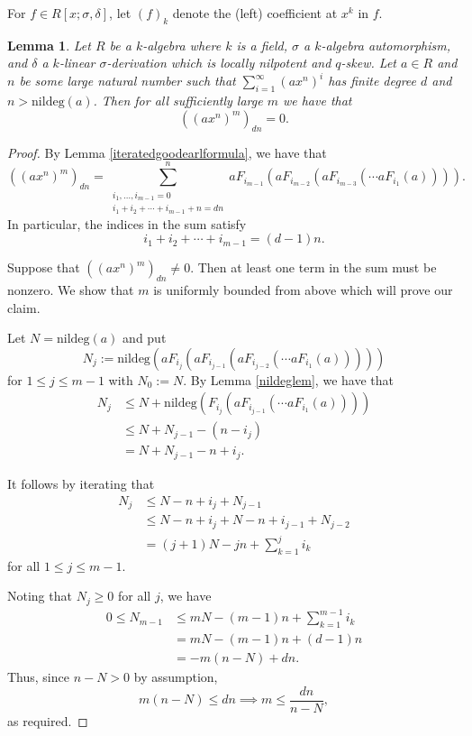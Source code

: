 \documentclass[12pt]{amsart}
\newtheorem{lem}[thm]{Lemma}
\theoremstyle{definition}
\theoremstyle{definition}
\theoremstyle{definition}
\theoremstyle{remark}
\theoremstyle{definition}
\begin{document}
For $f \in R[x;\sigma,\delta]$, let $(f)_k$ denote the (left) coefficient at $x^k$ in $f$.

\begin{lem}
    \label{mexists}  Let $R$ be a $k$-algebra where $k$ is a field, $\sigma$ a $k$-algebra automorphism, and $\delta$ a $k$-linear
    $\sigma$-derivation which is locally nilpotent and $q$-skew. Let $a \in R$ and $n$ be some large natural number such that $\sum_{i=1}^\infty (ax^n)^i$ has finite degree $d$ and $n > \text{nildeg}(a)$. Then for all sufficiently large $m$ we have that \[
        ((ax^n)^m)_{dn} = 0.
    \]
\end{lem}

\begin{proof}
    By Lemma \ref{iteratedgoodearlformula}, we have that \[
        ((ax^n)^m)_{dn} = \sum_{\substack{i_1,\dots,i_{m-1} = 0\\i_1+i_2+\cdots+i_{m-1} +n = dn}}^n aF_{i_{m-1}}(aF_{i_{m-2}}(aF_{i_{m-3}}(\cdots aF_{i_1}(a)))).
    \]
    In particular, the indices in the sum satisfy\[
        i_1+i_2+\cdots+i_{m-1} = (d-1)n.
    \]
    
    Suppose that $((ax^n)^m)_{dn} \neq 0$. Then at least one term in the sum must be nonzero. We show that $m$ is uniformly bounded from above which will prove our claim. 
    
    Let $N = \text{nildeg}(a)$ and put $$N_j := \text{nildeg}(aF_{i_{j}}(aF_{i_{j-1}}(aF_{i_{j-2}}(\cdots aF_{i_1}(a)))))$$ for $1 \leq j \leq m-1$ with $N_0 := N$. By Lemma \ref{nildeglem}, we have that \begin{align*}
        N_j &\leq N + \text{nildeg}(F_{i_{j}}(aF_{i_{j-1}}(\cdots aF_{i_1}(a)))) \\&\leq N+N_{j-1}-(n-i_j) \\&=N+N_{j-1}-n+i_{j}.\end{align*}

    It follows by iterating that \begin{align*}
        N_j &\leq N-n+i_j+N_{j-1} \\&\leq N-n+i_j +N-n+i_{j-1}+N_{j-2}\\&= (j+1)N-jn+\sum_{k=1}^ji_k\end{align*}for all $1\leq j \leq m-1$.

    Noting that $N_j \geq 0$ for all $j$, we have \begin{align*}
        0\leq N_{m-1}&\leq mN-(m-1)n+\sum_{k=1}^{m-1}i_k \\&= mN- (m-1)n+(d-1)n \\&= -m(n-N)+dn.
    \end{align*} Thus, since $n-N > 0$ by assumption,\[
        m(n-N)\leq dn \implies m \leq \frac{dn}{n-N}, 
    \] as required. 
\end{proof}
\end{document}
